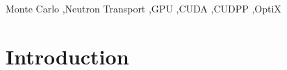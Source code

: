 \documentclass[preprint,12pt]{elsarticle}
\begin{document}
\begin{frontmatter}
\begin{abstract}
\end{abstract}

\begin{keyword}
Monte Carlo \sep Neutron Transport \sep GPU \sep CUDA \sep CUDPP \sep OptiX


\end{keyword}

\end{frontmatter}

\linenumbers


\section{Introduction}
\label{sec:intro}


\end{document}
